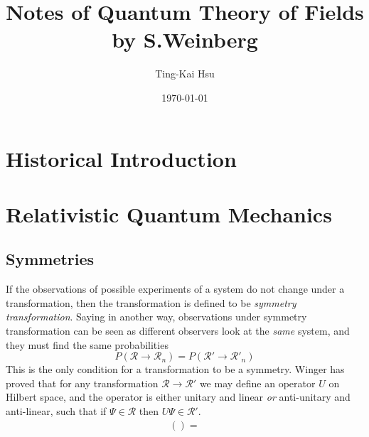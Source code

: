 \documentclass[12pt]{article}
\title{Notes of Quantum Theory of Fields by S.Weinberg}
\author{Ting-Kai Hsu}
\date{\today}
\numberwithin{equation}{subsection}
\begin{document}
\maketitle
\tableofcontents
\section{Historical Introduction}
\section{Relativistic Quantum Mechanics}
\subsection{Symmetries}
If the observations of possible experiments of a system do not change under a transformation, then the transformation is defined to be \textit{symmetry transformation}.
Saying in another way, observations under symmetry transformation can be seen as different observers look at the \textit{same} system, and they must find the same probabilities
\begin{equation}
    P(\mathcal{R}\rightarrow\mathcal{R}_n) = P(\mathcal{R'}\rightarrow\mathcal{R}'_n)
\end{equation} 
This is the only condition for a transformation to be a symmetry.
Winger\cite{wigner1944gruppentheorie} has proved that for any transformation $\mathcal{R}\rightarrow\mathcal{R}'$ we may define an operator $U$ on Hilbert space, and the operator is either unitary and linear \textit{or} anti-unitary and anti-linear, such that if $\Psi\in\mathcal{R}$ then $U\Psi\in\mathcal{R}'$.
\begin{equation}
    \begin{split}
        () = 
    \end{split}
\end{equation}


\end{document}
